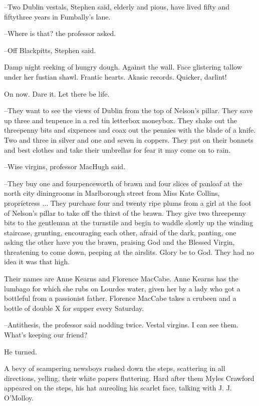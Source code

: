 --Two Dublin vestals, Stephen said, elderly and pious, have lived fifty
and fiftythree years in Fumbally's lane.

--Where is that? the professor asked.

--Off Blackpitts, Stephen said.

Damp night reeking of hungry dough. Against the wall. Face
glistering tallow under her fustian shawl. Frantic hearts. Akasic records.
Quicker, darlint!

On now. Dare it. Let there be life.

--They want to see the views of Dublin from the top of Nelson's pillar.
They save up three and tenpence in a red tin letterbox moneybox. They
shake out the threepenny bits and sixpences and coax out the pennies with
the blade of a knife. Two and three in silver and one and seven in
coppers. They put on their bonnets and best clothes and take their
umbrellas for fear it may come on to rain.

--Wise virgins, professor MacHugh said.



--They buy one and fourpenceworth of brawn and four slices of panloaf at
the north city diningrooms in Marlborough street from Miss Kate Collins,
proprietress ... They purchase four and twenty ripe plums from a girl at
the foot of Nelson's pillar to take off the thirst of the brawn. They give
two threepenny bits to the gentleman at the turnstile and begin to waddle
slowly up the winding staircase, grunting, encouraging each other, afraid
of the dark, panting, one asking the other have you the brawn, praising
God and the Blessed Virgin, threatening to come down, peeping at the
airslits. Glory be to God. They had no idea it was that high.

Their names are Anne Kearns and Florence MacCabe. Anne Kearns
has the lumbago for which she rubs on Lourdes water, given her by a lady
who got a bottleful from a passionist father. Florence MacCabe takes a
crubeen and a bottle of double X for supper every Saturday.

--Antithesis, the professor said nodding twice. Vestal virgins. I can see
them. What's keeping our friend?

He turned.

A bevy of scampering newsboys rushed down the steps, scattering in
all directions, yelling, their white papers fluttering. Hard after them
Myles Crawford appeared on the steps, his hat aureoling his scarlet face,
talking with J. J. O'Molloy.

